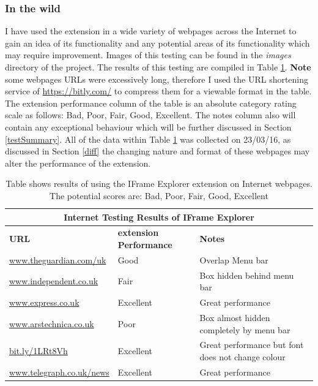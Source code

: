 \documentclass[12pt]{article}
\begin{document}
\subsubsection{In the wild} \label{ieWild}
I have used the extension in a wide variety of webpages across the Internet to gain an idea of its functionality and any potential areas of its functionality which may require improvement. Images of this testing can be found in the \textit{images} directory of the project. The results of this testing are compiled in Table \ref{table:2}. \textbf{Note} some webpages URLs were excessively long, therefore I used the URL shortening service of \url{https://bitly.com/} to compress them for a viewable format in the table. The extension performance column of the table is an absolute category rating scale as follows: Bad, Poor, Fair, Good, Excellent. The notes column also will contain any exceptional behaviour which will be further discussed in Section \ref{testSummary}. All of the data within Table \ref{table:2} was collected on 23/03/16, as discussed in Section \ref{diff} the changing nature and format of these webpages may alter the performance of the extension. \\

{
\begin{table} [H]
\centering
\begin{tabular}{ |p{5cm}|p{5cm}|p{5cm}|  }
\hline
\multicolumn{3}{|c|}{\textbf{Internet Testing Results of IFrame Explorer}} \\
\hline
\textbf{URL} & \textbf{extension Performance} & \textbf{Notes} \\
\hline
\url{www.theguardian.com/uk} & Good & Overlap Menu bar \\
\hline
\url{www.independent.co.uk} & Fair & Box hidden behind menu bar \\
\hline
\url{www.express.co.uk} & Excellent & Great performance \\
\hline
\url{www.arstechnica.co.uk} & Poor & Box almost hidden completely by menu bar  \\
\hline
\url{bit.ly/1LRt8Vh} & Excellent & Great performance but font does not change colour \\
\hline
\url{www.telegraph.co.uk/news} & Excellent & Great performance   \\
\hline
\end{tabular}
\caption{Table shows results of using the IFrame Explorer extension on Internet webpages. The potential scores are: Bad, Poor, Fair, Good, Excellent}
\label{table:2}
\end{table}
}
\end{document}
